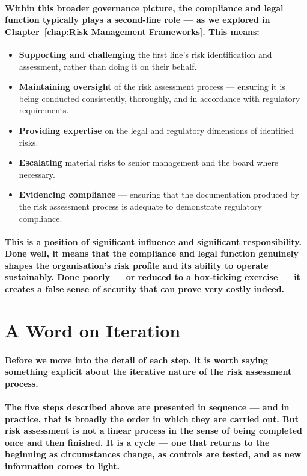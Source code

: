 \paragraph{Within this broader governance picture, the compliance and legal function typically plays a second-line role — as we explored in Chapter~\ref{chap:Risk Management Frameworks}. This means:}
\begin{itemize}
    \item{\textbf{Supporting and challenging} the first line's risk identification and assessment, rather than doing it on their behalf.}
    \item{\textbf{Maintaining oversight} of the risk assessment process — ensuring it is being conducted consistently, thoroughly, and in accordance with regulatory requirements.}
    \item{\textbf{Providing expertise} on the legal and regulatory dimensions of identified risks.}
    \item{\textbf{Escalating} material risks to senior management and the board where necessary.}
    \item{\textbf{Evidencing compliance} — ensuring that the documentation produced by the risk assessment process is adequate to demonstrate regulatory compliance.}
\end{itemize}
\paragraph{This is a position of significant influence and significant responsibility. Done well, it means that the compliance and legal function genuinely shapes the organisation's risk profile and its ability to operate sustainably. Done poorly — or reduced to a box-ticking exercise — it creates a false sense of security that can prove very costly indeed.}

\section{A Word on Iteration}
\paragraph{Before we move into the detail of each step, it is worth saying something explicit about the iterative nature of the risk assessment process.}
\paragraph{The five steps described above are presented in sequence — and in practice, that is broadly the order in which they are carried out. But risk assessment is not a linear process in the sense of being completed once and then finished. It is a \textbf{cycle} — one that returns to the beginning as circumstances change, as controls are tested, and as new information comes to light.}

